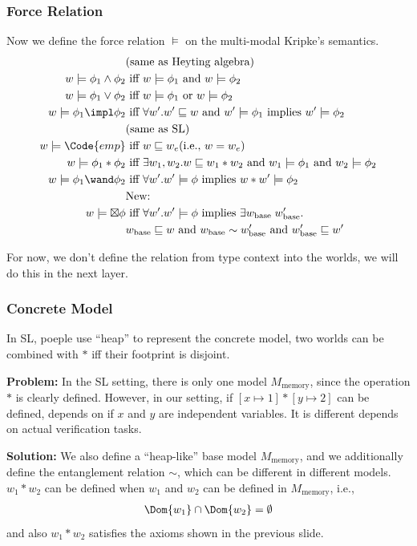 \begin{frame}[fragile]
    \frametitle{Force Relation}
Now we define the force relation $\models$ on the multi-modal Kripke's semantics.
\begin{align*}
    &\text{(same as Heyting algebra)}
    \\w \models \phi_1 \land \phi_2 &\text{ iff } w \models \phi_1 \text{ and } w \models \phi_2
    \\w \models \phi_1 \lor \phi_2 &\text{ iff } w \models \phi_1 \text{ or } w \models \phi_2
    \\w \models \phi_1 \impl \phi_2 &\text{ iff } \forall w'. w' \sqsubseteq w \text{ and } w' \models \phi_1 \text{ implies } w' \models \phi_2
    \\&\text{(same as SL)}
    \\w \models \Code{emp} &\text{ iff } w \sqsubseteq w_e \text{(i.e., $w = w_e$)}
    \\w \models \phi_1 * \phi_2 &\text{ iff } \exists w_1, w_2. w \sqsubseteq w_1 * w_2 \text{ and } w_1 \models \phi_1 \text{ and } w_2 \models \phi_2
    \\w \models \phi_1 \wand \phi_2 &\text{ iff } \forall w'. w' \models \phi \text{ implies } w * w' \models \phi_2
    \\&\text{New:}
    \\w \models \boxtimes \phi &\text{ iff } \forall w'. w' \models \phi \text{ implies } \exists w_\text{base}\;w_\text{base}'. 
    \\&w_\text{base} \sqsubseteq w \text{ and } w_\text{base} \sim w_\text{base}' \text{ and } w_\text{base}' \sqsubseteq w'
\end{align*}\noindent

For now, we don't define the relation from type context into the worlds, we will do this in the next layer.
\end{frame}

\begin{frame}[fragile]
    \frametitle{Concrete Model}
In SL, poeple use ``heap'' to represent the concrete model, two worlds can be combined with $*$ iff their footprint is disjoint.

\textbf{Problem:} In the SL setting, there is only one model $M_\text{memory}$, since the operation $*$ is clearly defined. However, in our setting, if $[x \mapsto 1] * [y \mapsto 2]$ can be defined, depends on if $x$ and $y$ are independent variables. It is different depends on actual verification tasks.

\textbf{Solution:} We also define a ``heap-like'' base model $M_\text{memory}$, and we additionally define the entanglement relation $\sim$, which can be different in different models. $w_1 * w_2$ can be defined when $w_1$ and $w_2$ can be defined in $M_\text{memory}$, i.e.,
\begin{align*}
    \Dom{w_1} \cap \Dom{w_2} = \emptyset
\end{align*}\noindent
and also $w_1 * w_2$ satisfies the axioms shown in the previous slide.

\end{frame}

